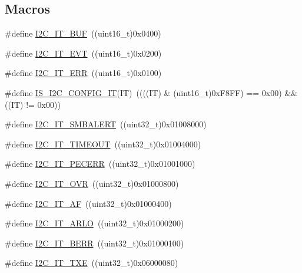\subsection*{Macros}
\begin{DoxyCompactItemize}
\item 
\#define \hyperlink{group___i2_c__interrupts__definition_gad3ff3f405b882aa4d2f91310aa1cc0df}{I2\+C\+\_\+\+I\+T\+\_\+\+B\+UF}~((uint16\+\_\+t)0x0400)
\item 
\#define \hyperlink{group___i2_c__interrupts__definition_gadd59efa313e1598a084a1e5ec3905b02}{I2\+C\+\_\+\+I\+T\+\_\+\+E\+VT}~((uint16\+\_\+t)0x0200)
\item 
\#define \hyperlink{group___i2_c__interrupts__definition_gadba3667b439cbf4ba1e6e9aec961ab03}{I2\+C\+\_\+\+I\+T\+\_\+\+E\+RR}~((uint16\+\_\+t)0x0100)
\item 
\#define \hyperlink{group___i2_c__interrupts__definition_gae2695a081871336881f9105d6c847c4f}{I\+S\+\_\+\+I2\+C\+\_\+\+C\+O\+N\+F\+I\+G\+\_\+\+IT}(IT)~((((IT) \& (uint16\+\_\+t)0x\+F8\+F\+F) == 0x00) \&\& ((\+I\+T) != 0x00))
\item 
\#define \hyperlink{group___i2_c__interrupts__definition_gab6049d4dd856a085127752e01ebb8120}{I2\+C\+\_\+\+I\+T\+\_\+\+S\+M\+B\+A\+L\+E\+RT}~((uint32\+\_\+t)0x01008000)
\item 
\#define \hyperlink{group___i2_c__interrupts__definition_ga45ce34b163b456a5fb3833f1264d93b4}{I2\+C\+\_\+\+I\+T\+\_\+\+T\+I\+M\+E\+O\+UT}~((uint32\+\_\+t)0x01004000)
\item 
\#define \hyperlink{group___i2_c__interrupts__definition_ga23069e7787c4f052f34887c02bc44100}{I2\+C\+\_\+\+I\+T\+\_\+\+P\+E\+C\+E\+RR}~((uint32\+\_\+t)0x01001000)
\item 
\#define \hyperlink{group___i2_c__interrupts__definition_ga8e1e9e73d9057ccfce3493b5cf672833}{I2\+C\+\_\+\+I\+T\+\_\+\+O\+VR}~((uint32\+\_\+t)0x01000800)
\item 
\#define \hyperlink{group___i2_c__interrupts__definition_gabfb721ac5783336e6d2334f635e2e91b}{I2\+C\+\_\+\+I\+T\+\_\+\+AF}~((uint32\+\_\+t)0x01000400)
\item 
\#define \hyperlink{group___i2_c__interrupts__definition_ga2439154bee2a45a4147921cec18177d1}{I2\+C\+\_\+\+I\+T\+\_\+\+A\+R\+LO}~((uint32\+\_\+t)0x01000200)
\item 
\#define \hyperlink{group___i2_c__interrupts__definition_gad9aec016c98df6dbb95a5c10b180c202}{I2\+C\+\_\+\+I\+T\+\_\+\+B\+E\+RR}~((uint32\+\_\+t)0x01000100)
\item 
\#define \hyperlink{group___i2_c__interrupts__definition_gacb41229da2cd9460c3272cfb13aa29d3}{I2\+C\+\_\+\+I\+T\+\_\+\+T\+XE}~((uint32\+\_\+t)0x06000080)

\end{DoxyCompactItemize}
